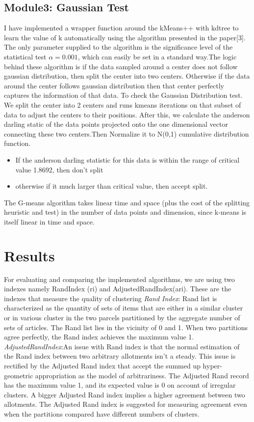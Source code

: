 \documentclass[conference]{IEEEtran}
\begin{document}
\subsection{Module3: Gaussian Test}
I have implemented a wrapper function around the kMeans++ with kdtree to learn the value of k automatically using the algorithm presented in the paper[3]. The only parameter supplied to the algorithm is the signiﬁcance level of the statistical test $\alpha = 0.001$, which can easily be set in a standard way.The logic behind these algorithm is if the data sampled around a center does not follow gaussian distribution, then split the center into two centers. Otherwise if the data around the center follows gaussian distribution then that center perfectly captures the information of that data. To check the Gaussian Distribution test. We split the center into 2 centers and runs kmeans iterations on that subset of data to adjust the centers to their positions. After this, we calculate the anderson darling static of the data points projected onto the one dimensional vector connecting these two centers.Then Normalize it to N(0,1) cumulative distribution function.
\begin{itemize}
\item If the anderson darling statistic for this data is within the range of critical value 1.8692, then don't split
\item otherwise if it much larger than critical value, then accept split.
\end{itemize}
The G-means algorithm takes linear time and space (plus the cost of the splitting heuristic and test) in the number of data points and dimension, since k-means is itself linear in time and space.


\section{Results}
For evaluating and comparing the implemented algorithms, we are using two indexes namely RandIndex (ri) and AdjustedRandIndex(ari). These are the indexes that measure the quality of clustering
\vspace{1mm}
\newline
\textit{Rand Index}:
Rand list is characterized as the quantity of sets of items that are either in a similar cluster or in various cluster in the two parcels partitioned by the aggregate number of sets of articles. The Rand list lies in the vicinity of 0 and 1. When two partitions agree perfectly, the Rand index achieves the maximum value 1.
\vspace{1mm}
\newline
\textit{AdjustedRandIndex}:An issue with Rand index is that the normal estimation of the Rand index between two arbitrary allotments isn't a steady. This issue is rectified by the Adjusted Rand index that accept the summed up hyper-geometric appropriation as the model of arbitrariness. The Adjusted Rand record has the maximum value 1, and its expected value is 0 on account of irregular clusters. A bigger Adjusted Rand index implies a higher agreement between two allotments. The Adjusted Rand index is suggested for measuring agreement even when the partitions compared have different numbers of clusters.\\
\end{document}
